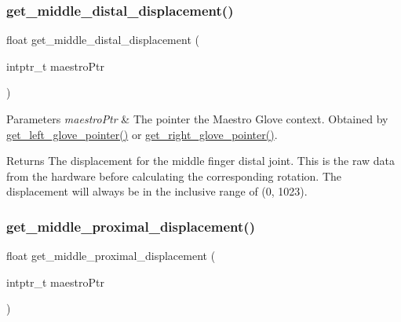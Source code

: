 \subsubsection{\texorpdfstring{get\+\_\+middle\+\_\+distal\+\_\+displacement()}{get\_middle\_distal\_displacement()}}
{\footnotesize\ttfamily float get\+\_\+middle\+\_\+distal\+\_\+displacement (\begin{DoxyParamCaption}\item[{intptr\+\_\+t}]{maestro\+Ptr }\end{DoxyParamCaption})}


\begin{DoxyParams}{Parameters}
{\em maestro\+Ptr} & The pointer the Maestro Glove context. Obtained by \hyperlink{group__glove_management_ga63ce3c99d4a8b8db851b22af9185764e}{get\+\_\+left\+\_\+glove\+\_\+pointer()} or \hyperlink{group__glove_management_ga9b8fd9d91aeac3f8da50f7a7eba0c32b}{get\+\_\+right\+\_\+glove\+\_\+pointer()}. \\
\hline
\end{DoxyParams}
\begin{DoxyReturn}{Returns}
The displacement for the middle finger distal joint. This is the raw data from the hardware before calculating the corresponding rotation. The displacement will always be in the inclusive range of (0, 1023). 
\end{DoxyReturn}
\mbox{\label{group__displacement_access_gabcd534e7e94fcbb7b35ce0406dd500bd}} 
\subsubsection{\texorpdfstring{get\+\_\+middle\+\_\+proximal\+\_\+displacement()}{get\_middle\_proximal\_displacement()}}
{\footnotesize\ttfamily float get\+\_\+middle\+\_\+proximal\+\_\+displacement (\begin{DoxyParamCaption}\item[{intptr\+\_\+t}]{maestro\+Ptr }\end{DoxyParamCaption})}


